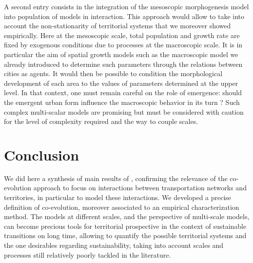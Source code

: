 \documentclass[11pt]{article}
\begin{document}
A second entry consists in the integration of the mesoscopic morphogenesis model into population of models in interaction. This approach would allow to take into account the non-stationarity of territorial systems that we moreover showed empirically. Here at the mesoscopic scale, total population and growth rate are fixed by exogenous conditions due to processes at the macroscopic scale. It is in particular the aim of spatial growth models such as the macroscopic model we already introduced to determine such parameters through the relations between cities as agents. It would then be possible to condition the morphological development of each area to the values of parameters determined at the upper level. In that context, one must remain careful on the role of emergence: should the emergent urban form influence the macroscopic behavior in its turn ? Such complex multi-scalar models are promising but must be considered with caution for the level of complexity required and the way to couple scales.


\section{Conclusion}

We did here a synthesis of main results of \cite{raimbault2018caracterisation}, confirming the relevance of the co-evolution approach to focus on interactions between transportation networks and territories, in particular to model these interactions. We developed a precise definition of co-evolution, moreover associated to an empirical characterization method. The models at different scales, and the perspective of multi-scale models, can become precious tools for territorial prospective in the context of sustainable transitions on long time, allowing to quantify the possible territorial systems and the one desirables regarding sustainability, taking into account scales and processes still relatively poorly tackled in the literature.








\end{document}
